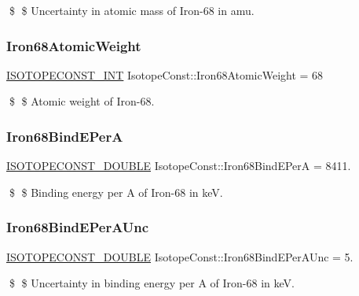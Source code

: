 \$ \$ Uncertainty in atomic mass of Iron-\/68 in amu. \mbox{\label{group___isotope_const-_iron-_fe68_ga755545901fecea7f088b02fbf471f201}} 
\subsubsection{\texorpdfstring{Iron68\+Atomic\+Weight}{Iron68AtomicWeight}}
{\footnotesize\ttfamily \mbox{\hyperlink{group___isotope_const-_macros_ga5f18360b3e99483a35c32d789e62621c}{I\+S\+O\+T\+O\+P\+E\+C\+O\+N\+S\+T\+\_\+\+I\+NT}} Isotope\+Const\+::\+Iron68\+Atomic\+Weight = 68}

\$ \$ Atomic weight of Iron-\/68. \mbox{\label{group___isotope_const-_iron-_fe68_gab846eb7ea65012442d7c04c59df6b473}} 
\subsubsection{\texorpdfstring{Iron68\+Bind\+E\+PerA}{Iron68BindEPerA}}
{\footnotesize\ttfamily \mbox{\hyperlink{group___isotope_const-_macros_ga8f45a7272ce02c0b4c65c44636ed719a}{I\+S\+O\+T\+O\+P\+E\+C\+O\+N\+S\+T\+\_\+\+D\+O\+U\+B\+LE}} Isotope\+Const\+::\+Iron68\+Bind\+E\+PerA = 8411.}

\$ \$ Binding energy per A of Iron-\/68 in keV. \mbox{\label{group___isotope_const-_iron-_fe68_gada36a0183158618cdf75e6b03b8a9617}} 
\subsubsection{\texorpdfstring{Iron68\+Bind\+E\+Per\+A\+Unc}{Iron68BindEPerAUnc}}
{\footnotesize\ttfamily \mbox{\hyperlink{group___isotope_const-_macros_ga8f45a7272ce02c0b4c65c44636ed719a}{I\+S\+O\+T\+O\+P\+E\+C\+O\+N\+S\+T\+\_\+\+D\+O\+U\+B\+LE}} Isotope\+Const\+::\+Iron68\+Bind\+E\+Per\+A\+Unc = 5.}

\$ \$ Uncertainty in binding energy per A of Iron-\/68 in keV. \mbox{\label{group___isotope_const-_iron-_fe68_gaa81ef4dcb37b3969d840295eed13225e}} 
